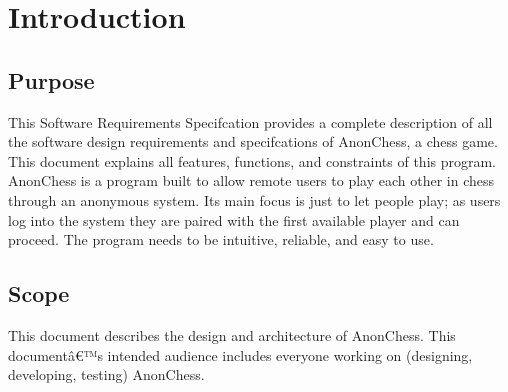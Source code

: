 \section{Introduction}

\subsection{Purpose}
This Software Requirements Specifcation provides a complete description of all the software design requirements and specifcations of AnonChess, a chess game. This document explains all features, functions, and constraints of this program.
AnonChess is a program built to allow remote users to play each other in chess through an anonymous system. Its main focus is just to let people play; as users log into the system they are paired with the first available player and can proceed. The program needs to be intuitive, reliable, and easy to use.
  
\subsection{Scope}
This document describes the design and architecture of AnonChess. This documentâ€™s intended audience includes everyone working on (designing, developing, testing) AnonChess.
